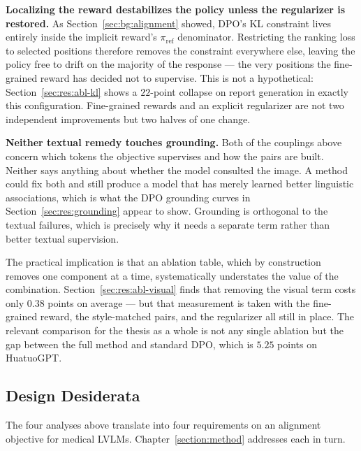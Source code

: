 \textbf{Localizing the reward destabilizes the policy unless the regularizer is restored.} As Section~\ref{sec:bg:alignment} showed, DPO's KL constraint lives entirely inside the implicit reward's $\pi_{\text{ref}}$ denominator. Restricting the ranking loss to selected positions therefore removes the constraint everywhere else, leaving the policy free to drift on the majority of the response --- the very positions the fine-grained reward has decided not to supervise. This is not a hypothetical: Section~\ref{sec:res:abl-kl} shows a $22$-point collapse on report generation in exactly this configuration. Fine-grained rewards and an explicit regularizer are not two independent improvements but two halves of one change.

\textbf{Neither textual remedy touches grounding.} Both of the couplings above concern which tokens the objective supervises and how the pairs are built. Neither says anything about whether the model consulted the image. A method could fix both and still produce a model that has merely learned better linguistic associations, which is what the DPO grounding curves in Section~\ref{sec:res:grounding} appear to show. Grounding is orthogonal to the textual failures, which is precisely why it needs a separate term rather than better textual supervision.

The practical implication is that an ablation table, which by construction removes one component at a time, systematically understates the value of the combination. Section~\ref{sec:res:abl-visual} finds that removing the visual term costs only $0.38$ points on average --- but that measurement is taken with the fine-grained reward, the style-matched pairs, and the regularizer all still in place. The relevant comparison for the thesis as a whole is not any single ablation but the gap between the full method and standard DPO, which is $5.25$ points on HuatuoGPT.

\subsection{Design Desiderata}
\label{sec:ana:desiderata}

The four analyses above translate into four requirements on an alignment objective for medical LVLMs. Chapter~\ref{section:method} addresses each in turn.

